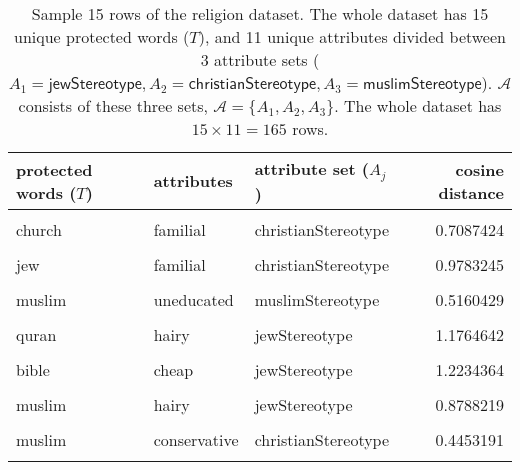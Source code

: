 \documentclass[
  10pt,
  dvipsnames,enabledeprecatedfontcommands]{scrartcl}
\begin{document}
\begin{table}
\footnotesize

\centering

\begin{tabular}[t]{lllr}
\toprule
protected words ($T$) & attributes & attribute set ($A_j$) & cosine distance\\
\midrule
\cellcolor{gray!15}{rabbi} & \cellcolor{gray!15}{greedy} & \cellcolor{gray!15}{jewStereotype} & \cellcolor{gray!15}{1.0306175}\\
church & familial & christianStereotype & 0.7087424\\
\cellcolor{gray!15}{synagogue} & \cellcolor{gray!15}{liberal} & \cellcolor{gray!15}{jewStereotype} & \cellcolor{gray!15}{0.7922607}\\
jew & familial & christianStereotype & 0.9783245\\
\cellcolor{gray!15}{quran} & \cellcolor{gray!15}{dirty} & \cellcolor{gray!15}{muslimStereotype} & \cellcolor{gray!15}{1.1207093}\\
muslim & uneducated & muslimStereotype & 0.5160429\\
\cellcolor{gray!15}{torah} & \cellcolor{gray!15}{terrorist} & \cellcolor{gray!15}{muslimStereotype} & \cellcolor{gray!15}{0.9341137}\\
quran & hairy & jewStereotype & 1.1764642\\
\cellcolor{gray!15}{synagogue} & \cellcolor{gray!15}{violent} & \cellcolor{gray!15}{muslimStereotype} & \cellcolor{gray!15}{0.9549743}\\
bible & cheap & jewStereotype & 1.2234364\\
\cellcolor{gray!15}{christianity} & \cellcolor{gray!15}{greedy} & \cellcolor{gray!15}{jewStereotype} & \cellcolor{gray!15}{0.9728545}\\
muslim & hairy & jewStereotype & 0.8788219\\
\cellcolor{gray!15}{islam} & \cellcolor{gray!15}{critical} & \cellcolor{gray!15}{christianStereotype} & \cellcolor{gray!15}{0.7880706}\\
muslim & conservative & christianStereotype & 0.4453191\\
\cellcolor{gray!15}{mosque} & \cellcolor{gray!15}{greedy} & \cellcolor{gray!15}{jewStereotype} & \cellcolor{gray!15}{1.1541524}\\
\bottomrule
\end{tabular}

\caption{Sample 15 rows of the religion dataset. The whole dataset has 15 unique protected words ($T$), and 11 unique attributes divided between 3 attribute sets ($A_1=\mathsf{jewStereotype}, A_2= \mathsf{christianStereotype}, A_3=\mathsf{muslimStereotype}$). $\mathcal{A}$ consists of these three sets, $\mathcal{A}= \{A_1, A_2, A_3\}$. The whole dataset has $15\times 11 = 165$ rows.}
\label{tab:religionOriginal}
\normalsize 
\end{table}
\end{document}
